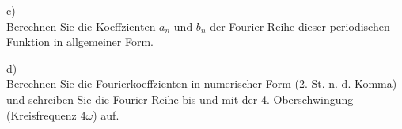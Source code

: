 c)\\
Berechnen Sie die Koeffzienten $a_n$ und $b_n$ der Fourier Reihe dieser periodischen Funktion in allgemeiner Form.


d)\\
Berechnen Sie die Fourierkoeffzienten in numerischer Form (2. St. n. d.
Komma) und schreiben Sie die Fourier Reihe bis und mit der 4. Oberschwingung (Kreisfrequenz $4\omega$) auf.